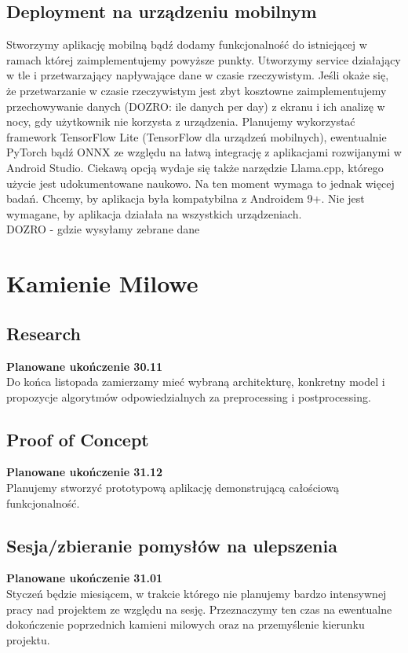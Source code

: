 \documentclass[12pt]{article}
\begin{document}
\subsection*{Deployment na urządzeniu mobilnym}
Stworzymy aplikację mobilną bądź dodamy funkcjonalność do istniejącej w ramach której zaimplementujemy powyższe punkty. Utworzymy service działający w tle i przetwarzający napływające dane w czasie rzeczywistym. Jeśli okaże się, że przetwarzanie w czasie rzeczywistym jest zbyt kosztowne zaimplementujemy przechowywanie danych (DOZRO: ile danych per day) z ekranu i ich analizę w nocy, gdy użytkownik nie korzysta z urządzenia. Planujemy wykorzystać framework TensorFlow Lite (TensorFlow dla urządzeń mobilnych), ewentualnie PyTorch bądź ONNX ze względu na łatwą integrację z aplikacjami rozwijanymi w Android Studio.
Ciekawą opcją wydaje się także narzędzie Llama.cpp, którego użycie jest udokumentowane naukowo\cite{LLMmobile2024}. Na ten moment wymaga to jednak więcej badań. Chcemy, by aplikacja była kompatybilna z Androidem 9+. Nie jest wymagane, by aplikacja działała na wszystkich urządzeniach.\\
DOZRO - gdzie wysyłamy zebrane dane
\section*{Kamienie Milowe}
\subsection*{Research}
\textbf{Planowane ukończenie 30.11}\\
Do końca listopada zamierzamy mieć wybraną architekturę, konkretny model i propozycje algorytmów odpowiedzialnych za preprocessing i postprocessing.
\subsection*{Proof of Concept}
\textbf{Planowane ukończenie 31.12}\\
Planujemy stworzyć prototypową aplikację demonstrującą całościową funkcjonalność. 
\subsection*{Sesja/zbieranie pomysłów na ulepszenia}
\textbf{Planowane ukończenie 31.01}\\
Styczeń będzie miesiącem, w trakcie którego nie planujemy bardzo intensywnej pracy nad projektem ze względu na sesję. Przeznaczymy ten czas na ewentualne dokończenie poprzednich kamieni milowych oraz na przemyślenie kierunku projektu.
\end{document}

